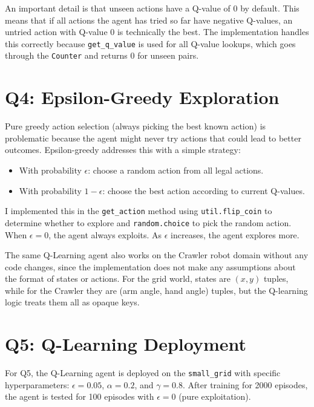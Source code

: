 \documentclass[11pt,a4paper]{article}
\begin{document}
An important detail is that unseen actions have a Q-value of 0 by default. This means that if all actions the agent has tried so far have negative Q-values, an untried action with Q-value 0 is technically the best. The implementation handles this correctly because \texttt{get\_q\_value} is used for all Q-value lookups, which goes through the \texttt{Counter} and returns 0 for unseen pairs.

\section{Q4: Epsilon-Greedy Exploration}

Pure greedy action selection (always picking the best known action) is problematic because the agent might never try actions that could lead to better outcomes. Epsilon-greedy addresses this with a simple strategy:

\begin{itemize}[leftmargin=2em]
    \item With probability $\epsilon$: choose a random action from all legal actions.
    \item With probability $1 - \epsilon$: choose the best action according to current Q-values.
\end{itemize}

I implemented this in the \texttt{get\_action} method using \texttt{util.flip\_coin} to determine whether to explore and \texttt{random.choice} to pick the random action. When $\epsilon = 0$, the agent always exploits. As $\epsilon$ increases, the agent explores more.

The same Q-Learning agent also works on the Crawler robot domain without any code changes, since the implementation does not make any assumptions about the format of states or actions. For the grid world, states are $(x, y)$ tuples, while for the Crawler they are (arm angle, hand angle) tuples, but the Q-learning logic treats them all as opaque keys.

\section{Q5: Q-Learning Deployment}

For Q5, the Q-Learning agent is deployed on the \texttt{small\_grid} with specific hyperparameters: $\epsilon = 0.05$, $\alpha = 0.2$, and $\gamma = 0.8$. After training for 2000 episodes, the agent is tested for 100 episodes with $\epsilon = 0$ (pure exploitation).
\end{document}
